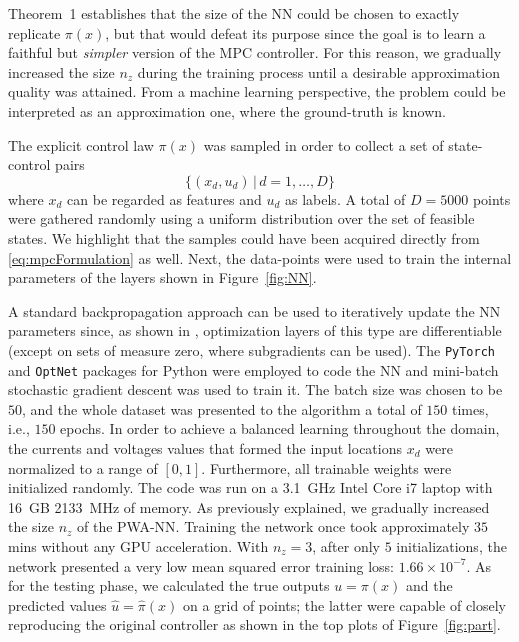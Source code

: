 Theorem~1 establishes that the size of the NN could be chosen to exactly replicate $\pi(x)$, but that would defeat its purpose since the goal is to learn a faithful but \textit{simpler} version of the MPC controller. For this reason, we gradually increased the size $n_z$ during the training process until a desirable approximation quality was attained. From a machine learning perspective, the problem could be interpreted as an approximation one, where the ground-truth is known.


The explicit control law $\pi(x)$ was sampled in order to collect a set of state-control pairs
\begin{equation}
	\{(x_d,u_d) \,|\, d=1,\dots,D\}
\end{equation}
where $x_d$ can be regarded as features and $u_d$ as labels. A total of $D = 5000$ points were gathered randomly using a uniform distribution over the set of feasible states. We highlight that the samples could have been acquired directly from \eqref{eq:mpcFormulation} as well. Next, the data-points were used to train the internal parameters of the layers shown in Figure~\ref{fig:NN}. 

A standard backpropagation approach can be used to iteratively update the NN parameters since, as shown in \cite{amos2017optnet}, optimization layers of this type are differentiable (except on sets of measure zero, where subgradients can be used). The \texttt{PyTorch} and \texttt{OptNet} packages for Python were employed to code the NN and mini-batch stochastic gradient descent was used to train it. The batch size was chosen to be $50$, and the whole dataset was presented to the algorithm a total of $150$ times, i.e., $150$ epochs. In order to achieve a balanced learning throughout the domain, the currents and voltages values that formed the input locations $x_d$ were normalized to a range of $[0,1]$. Furthermore, all trainable weights were initialized randomly. The code was run on a 3.1~GHz Intel Core i7 laptop with 16~GB 2133~MHz of memory. As previously explained, we gradually increased the size $n_z$ of the PWA-NN. Training the network once took approximately $35\,$mins without any GPU acceleration. With $n_z=3$, after only $5$ initializations, the network presented a very low mean squared error training loss: $1.66\times 10^{-7}$. As for the testing phase, we calculated the true outputs $u = \pi(x)$ and the predicted values $\hat{u} = \hat{\pi}(x)$ on a grid of points; the latter were capable of closely reproducing the original controller as shown in the top plots of Figure~\ref{fig:part}.


